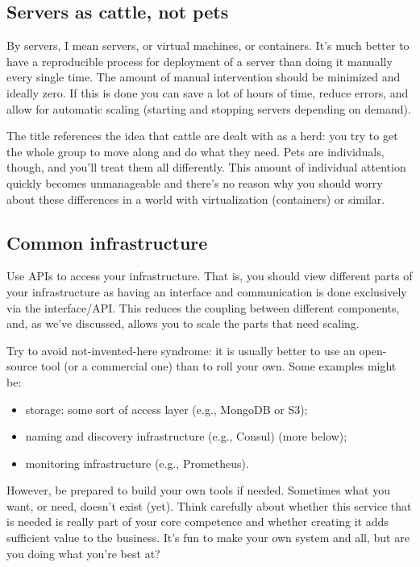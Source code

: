 \documentclass[a4paper]{report}
\begin{document}
\subsection*{Servers as cattle, not pets}
By servers, I mean servers, or virtual machines, or containers. It's much better to have a reproducible process for deployment of a server than doing it manually every single time. The amount of manual intervention should be minimized and ideally zero. If this is done you can save a lot of hours of time, reduce errors, and allow for automatic scaling (starting and stopping servers depending on demand).

The title references the idea that cattle are dealt with as a herd: you try to get the whole group to move along and do what they need. Pets are individuals, though, and you'll treat them all differently. This amount of individual attention quickly becomes unmanageable and there's no reason why you should worry about these differences in a world with virtualization (containers) or similar. 

\subsection*{Common infrastructure}
Use APIs to access your infrastructure. That is, you should view different parts of your infrastructure as having an interface and communication is done exclusively via the interface/API. This reduces the coupling between different components, and, as we've discussed, allows you to scale the parts that need scaling. 

Try to avoid not-invented-here syndrome: it is usually better to use an open-source tool (or a commercial one) than to roll your own. Some examples might be:
\begin{itemize}
\item storage: some sort of access layer (e.g., MongoDB or S3);
\item naming and discovery infrastructure (e.g., Consul) (more below);
\item monitoring infrastructure (e.g., Prometheus).
\end{itemize}

However, be prepared to build your own tools if needed. Sometimes what you want, or need, doesn't exist (yet). Think carefully about whether this service that is needed is really part of your core competence and whether creating it adds sufficient value to the business. It's fun to make your own system and all, but are you doing what you're best at? 
\end{document}
